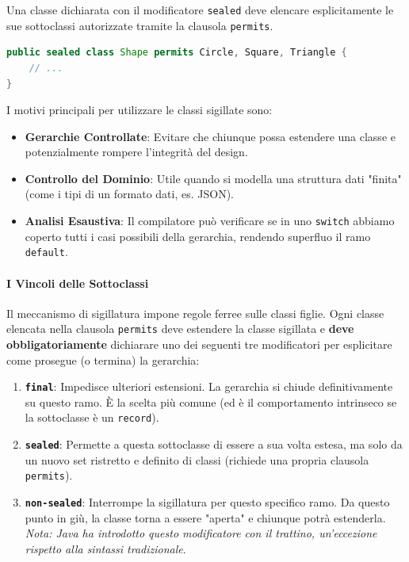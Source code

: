 Una classe dichiarata con il modificatore \texttt{sealed} deve elencare esplicitamente le sue sottoclassi autorizzate tramite la clausola \texttt{permits}.

\begin{lstlisting}[language=Java, caption={Esempio di Sealed Class}]
public sealed class Shape permits Circle, Square, Triangle {
    // ...
}
\end{lstlisting}

I motivi principali per utilizzare le classi sigillate sono:
\begin{itemize}
    \item \textbf{Gerarchie Controllate}: Evitare che chiunque possa estendere una classe e potenzialmente rompere l'integrità del design.
    \item \textbf{Controllo del Dominio}: Utile quando si modella una struttura dati "finita" (come i tipi di un formato dati, es. JSON).
    \item \textbf{Analisi Esaustiva}: Il compilatore può verificare se in uno \texttt{switch} abbiamo coperto tutti i casi possibili della gerarchia, rendendo superfluo il ramo \texttt{default}.
\end{itemize}

\paragraph{I Vincoli delle Sottoclassi}

Il meccanismo di sigillatura impone regole ferree sulle classi figlie. Ogni classe elencata nella clausola \texttt{permits} deve estendere la classe sigillata e \textbf{deve obbligatoriamente} dichiarare uno dei seguenti tre modificatori per esplicitare come prosegue (o termina) la gerarchia:

\begin{enumerate}
    \item \textbf{\texttt{final}}: Impedisce ulteriori estensioni. La gerarchia si chiude definitivamente su questo ramo. È la scelta più comune (ed è il comportamento intrinseco se la sottoclasse è un \texttt{record}).
    \item \textbf{\texttt{sealed}}: Permette a questa sottoclasse di essere a sua volta estesa, ma solo da un nuovo set ristretto e definito di classi (richiede una propria clausola \texttt{permits}).
    \item \textbf{\texttt{non-sealed}}: Interrompe la sigillatura per questo specifico ramo. Da questo punto in giù, la classe torna a essere "aperta" e chiunque potrà estenderla. \textit{Nota: Java ha introdotto questo modificatore con il trattino, un'eccezione rispetto alla sintassi tradizionale}.
\end{enumerate}

